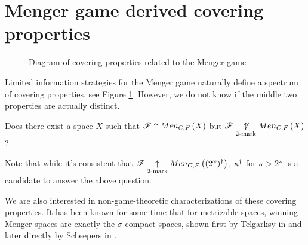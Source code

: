 \section{Menger game derived covering properties}

\begin{figure}[h]
\begin{center}
\end{center}
\caption{Diagram of covering properties related to the Menger game}
\label{menSpec}
\end{figure}

Limited information strategies for the Menger game naturally define a spectrum
of covering properties, see Figure \ref{menSpec}. However,
we do not know if the middle two properties are actually distinct.

\begin{ques}\label{perfectTo2Mark}
  Does there exist a space $X$ such that $\mathscr{F} \uparrow Men_{C,F}\left({X}\right)$ but
  $\mathscr{F} \underset{2\text{-mark}}{\not\uparrow} Men_{C,F}\left({X}\right)$?
\end{ques}

Note that while it's consistent that
$\mathscr{F}\underset{2\text{-mark}}{\uparrow}Men_{C,F}\left({(2^\omega)^\dagger}\right)$, $\kappa^\dagger$
for $\kappa>2^\omega$ is a candidate to answer the above question.

We are also interested in non-game-theoretic characterizations of these
covering properties. It has been known for some time that for metrizable spaces,
winning Menger spaces are exactly the $\sigma$-compact spaces, shown first
by Telgarksy in \cite{MR753073} and later directly by Scheepers in
\cite{MR1273523}.

